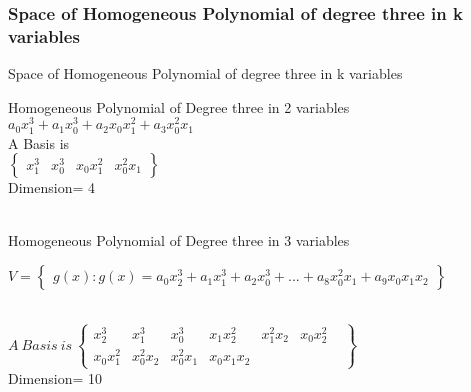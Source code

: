 \documentclass{beamer}
\newenvironment{changemargin}[2]{%
  \begin{list}{}{%
    \setlength{\topsep}{0pt}%
    \setlength{\leftmargin}{#1}%
    \setlength{\rightmargin}{#2}%
    \setlength{\listparindent}{\parindent}%
    \setlength{\itemindent}{\parindent}%
    \setlength{\parsep}{\parskip}%
  }%
  \item[]}{\end{list}}
\begin{document}
\begin{frame}
    \frametitle{Space of Homogeneous Polynomial of degree three in k variables}
\begin{block}
    {Space of Homogeneous Polynomial of degree three in k variables}
\begin{itemize}
\item Homogeneous Polynomial of Degree three in 2 variables\\
$a_{0}x_{1}^{3}+a_{1}x_{0}^{3}+a_{2}x_{0}x_{1}^{2}+a_{3}x_{0}^{2}x_{1}$\\
A Basis is\\
$\begin{Bmatrix}x_{1}^{3}&x_{0}^{3}&x_{0}x_{1}^{2}&x_{0}^{2}x_{1}\end{Bmatrix}$
\\
Dimension= 4\\\\
\item Homogeneous Polynomial of Degree three in 3 variables\\
\begin{changemargin}{-4pt}{0pt}
{$V=\begin{Bmatrix}
g(x):g(x)=a_{0}x_{2}^{3}+a_{1}x_{1}^{3}+a_{2}x_{0}^{3}+...+a_{8}x_{0}^{2}x_{1}+a_{9}x_{0}x_{1}x_{2}\end{Bmatrix}$}
\end{changemargin}\\

$A~Basis~ is~\begin{Bmatrix}x_{2}^{3}&x_{1}^{3}&x_{0}^{3}&x_{1}x_{2}^{2}&x_{1}^{2}x_{2}&x_{0}x_{2}^{2}&\\x_{0}x_{1}^{2}&x_{0}^{2}x_{2}&x_{0}^{2}x_{1}&x_{0}x_{1}x_{2}\end{Bmatrix}$
\\
Dimension= 10
\end{itemize}
\end{block}
\end{frame}
\end{document}
